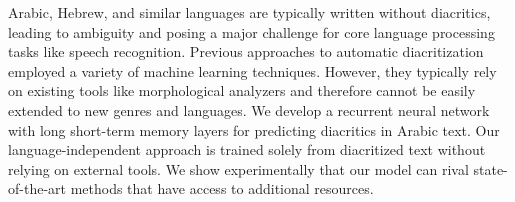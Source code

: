 Arabic, Hebrew, and similar languages are typically written without diacritics, leading to ambiguity and posing a major challenge for core language processing tasks like speech recognition. Previous approaches to automatic diacritization employed a variety of machine learning techniques. However, they typically rely on existing tools like morphological analyzers and therefore cannot be easily extended to new genres and languages. We develop a recurrent neural network with long short-term memory layers for predicting diacritics in Arabic text. Our language-independent approach is trained solely from diacritized text without relying on external tools. We show experimentally that our model can rival state-of-the-art methods that have access to additional resources.
